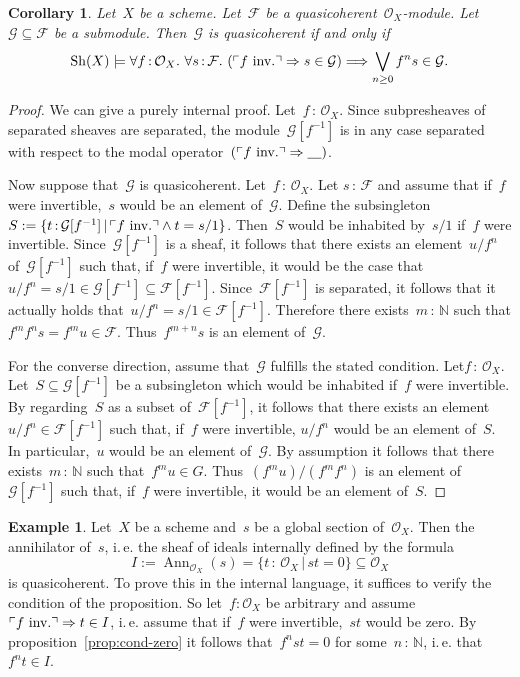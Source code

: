 \documentclass[10pt]{amsart}
\makeatletter
\theoremstyle{definition}
\newtheorem{ex}[defn]{Example}
\theoremstyle{plain}
\newtheorem{cor}[defn]{Corollary}
\theoremstyle{remark}
\newcommand{\F}{\mathcal{F}}
\newcommand{\G}{\mathcal{G}}
\renewcommand{\O}{\mathcal{O}}
\newcommand{\NN}{\mathbb{N}}
\newcommand{\placeholder}{\underline{\quad}}
\newcommand{\Sh}{\mathrm{Sh}}
\DeclareMathOperator{\Ann}{Ann}
\newcommand{\?}{\,{:}\,}
\renewcommand{\_}{\mathpunct{.}\,}
\newcommand{\speak}[1]{\ulcorner\text{\textnormal{#1}}\urcorner}
\newcommand{\ie}{i.\,e.\@\xspace}
\makeatother
\begin{document}
\begin{cor}Let~$X$ be a scheme. Let~$\F$ be a quasicoherent~$\O_X$-module.
Let~$\G \subseteq \F$ be a submodule. Then~$\G$ is quasicoherent if and only
if
\[ \Sh(X) \models \forall f\?\O_X\_
  \forall s\?\F\_
  (\speak{$f$ inv.} \Rightarrow s \in \G) \Longrightarrow
  \bigvee_{n \geq 0} f^n s \in \G. \]
\end{cor}
\begin{proof}We can give a purely internal proof. Let~$f\?\O_X$.
Since subpresheaves of separated sheaves are separated, the module~$\G[f^{-1}]$
is in any case separated with respect to the modal operator~$(\speak{$f$ inv.}
\Rightarrow \placeholder)$.

Now suppose that~$\G$ is quasicoherent. Let~$f\?\O_X$. Let $s\?\F$ and assume that
if~$f$ were invertible,~$s$ would be an element of~$\G$. Define the
subsingleton~$S := \{ t\?\G[f^{-1}] \,|\, \speak{$f$ inv.} \wedge t=s/1 \}$.
Then~$S$ would be inhabited by~$s/1$ if~$f$ were invertible. Since~$\G[f^{-1}]$
is a sheaf, it follows that there exists an element~$u/f^n$ of~$\G[f^{-1}]$
such that, if~$f$ were invertible, it would be the case that~$u/f^n = s/1 \in
\G[f^{-1}] \subseteq \F[f^{-1}]$.
Since~$\F[f^{-1}]$ is separated, it follows that it actually holds that~$u/f^n
= s/1 \in \F[f^{-1}]$. Therefore there exists~$m\?\NN$ such that $f^m f^n s =
f^m u \in \F$. Thus~$f^{m+n} s$ is an element of~$\G$.

For the converse direction, assume that~$\G$ fulfills the stated condition.
Let$f\?\O_X$. Let~$S \subseteq \G[f^{-1}]$ be a subsingleton which would be
inhabited if~$f$ were invertible. By regarding~$S$ as a subset of~$\F[f^{-1}]$,
it follows that there exists an element~$u/f^n \in \F[f^{-1}]$ such that,
if~$f$ were invertible, $u/f^n$ would be an element of~$S$. In particular,~$u$
would be an element of~$\G$. By assumption
it follows that there exists~$m\?\NN$ such that~$f^m u \in G$. Thus~$(f^m u) /
(f^m f^n)$ is an element of~$\G[f^{-1}]$ such that, if~$f$ were invertible, it
would be an element of~$S$.
\end{proof}

\begin{ex}\label{ex:annihilator-qcoh}
Let~$X$ be a scheme and~$s$ be a global section of~$\O_X$. Then the
annihilator of~$s$, \ie the sheaf of ideals internally defined by the
formula
\[ I := \Ann_{\O_X}(s) = \{ t\?\O_X \,|\, st = 0 \} \subseteq \O_X \]
is quasicoherent. To prove this in the internal language, it suffices to
verify the condition of the proposition.
So let~$f:\O_X$ be arbitrary and assume~$\speak{$f$ inv.} \Rightarrow t \in I$,
\ie assume that if~$f$ were invertible,~$st$ would be zero. By
proposition~\ref{prop:cond-zero} it follows that~$f^n st = 0$ for
some~$n\?\NN$, \ie that~$f^n t \in I$.
\end{ex}
\end{document}
